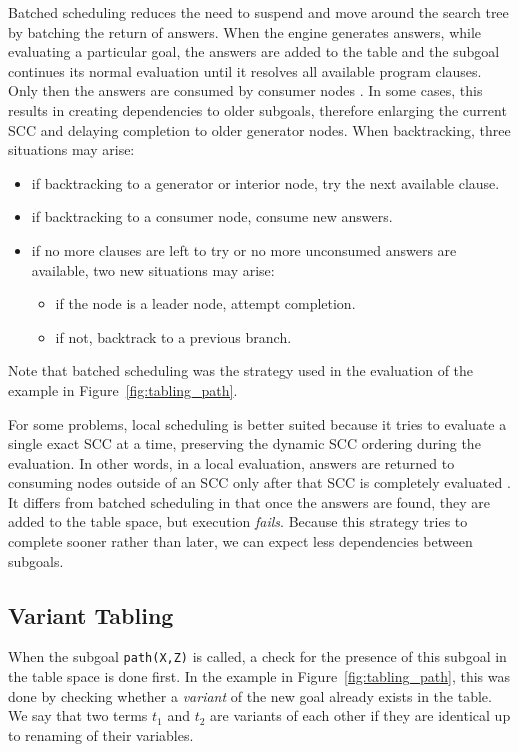 Batched scheduling reduces the need to suspend and move around the search tree by batching the return of answers.
When the engine generates answers, while evaluating a particular goal, the answers are added to the table and
the subgoal continues its normal evaluation until it resolves all available program clauses. Only then the answers
are consumed by consumer nodes \cite{Freire-96}. In some cases, this results in creating dependencies to older
subgoals, therefore enlarging the current SCC and delaying completion to older generator nodes. When backtracking,
three situations may arise:

\begin{itemize}
  \item if backtracking to a generator or interior node, try the next available clause.
  \item if backtracking to a consumer node, consume new answers.
  \item if no more clauses are left to try or no more unconsumed answers are available, two new situations may arise:
    \begin{itemize}
      \item if the node is a leader node, attempt completion.
      \item if not, backtrack to a previous branch.
    \end{itemize}
\end{itemize}

Note that batched scheduling was the strategy used in the evaluation of the example in Figure~\ref{fig:tabling_path}.

For some problems, local scheduling is better suited because it tries to evaluate a single exact SCC at a time, preserving the dynamic
SCC ordering during the evaluation. In other words, in a local evaluation, answers are returned to consuming nodes outside of an SCC only after that
SCC is completely evaluated \cite{Freire-96}.
It differs from batched scheduling in that once the answers are found, they are added to the table space, but execution
\textit{fails}. Because this strategy tries to complete sooner rather than later, we can expect less dependencies between subgoals.

\subsection{Variant Tabling} \label{sec:variant_tabling}

When the subgoal \texttt{path(X,Z)} is called, a check for the presence of this subgoal in the table space is done first.
In the example in Figure~\ref{fig:tabling_path}, this was done by checking whether a \textit{variant} of the new goal already
exists in the table. We say that two terms $t_1$ and $t_2$ are variants of each other if they are identical up to renaming of their
variables.

